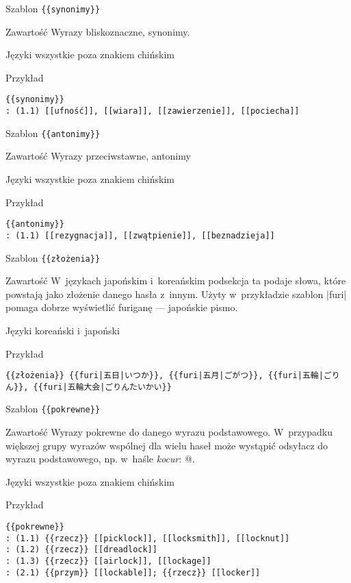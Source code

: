 \spacer
\begin{opis}
	\item[Szablon] \verb|{{synonimy}}|
	\item[Zawartość] Wyrazy bliskoznaczne, synonimy.
	\item[Języki] wszystkie poza znakiem chińskim
	\item[Przykład]
\begin{lstlisting}
{{synonimy}}
: (1.1) [[ufność]], [[wiara]], [[zawierzenie]], [[pociecha]]
\end{lstlisting}
\end{opis}
\spacer
\begin{opis}
	\item[Szablon] \verb|{{antonimy}}|
	\item[Zawartość] Wyrazy przeciwstawne, antonimy
	\item[Języki] wszystkie poza znakiem chińskim
	\item[Przykład]
\begin{lstlisting}
{{antonimy}}
: (1.1) [[rezygnacja]], [[zwątpienie]], [[beznadzieja]]
\end{lstlisting}
\end{opis}
\spacer
\begin{opis}
	\item[Szablon] \verb|{{złożenia}}|
	\item[Zawartość] W~językach japońskim i~koreańskim podsekcja ta podaje słowa, które powstają jako złożenie danego hasła z~innym. Użyty w~przykładzie szablon \kod|{{furi}}| pomaga dobrze wyświetlić furiganę --- japońskie pismo.
	\item[Języki] koreański i~japoński
	\item[Przykład]
\begin{lstlisting}
{{złożenia}} {{furi|五日|いつか}}, {{furi|五月|ごがつ}}, {{furi|五輪|ごりん}}, {{furi|五輪大会|ごりんたいかい}}
\end{lstlisting}
\end{opis}
\spacer
\begin{opis}
	\item[Szablon] \verb|{{pokrewne}}|
	\item[Zawartość] Wyrazy pokrewne do danego wyrazu podstawowego. W~przypadku większej grupy wyrazów wspólnej dla wielu haseł może wystąpić odsyłacz do wyrazu podstawowego, np. w~haśle \emph{kocur}: @.
	\item[Języki] wszystkie poza znakiem chińskim
	\item[Przykład]
\begin{lstlisting}
{{pokrewne}}
: (1.1) {{rzecz}} [[picklock]], [[locksmith]], [[locknut]]
: (1.2) {{rzecz}} [[dreadlock]]
: (1.3) {{rzecz}} [[airlock]], [[lockage]]
: (2.1) {{przym}} [[lockable]]; {{rzecz}} [[locker]]
\end{lstlisting}
\end{opis}
